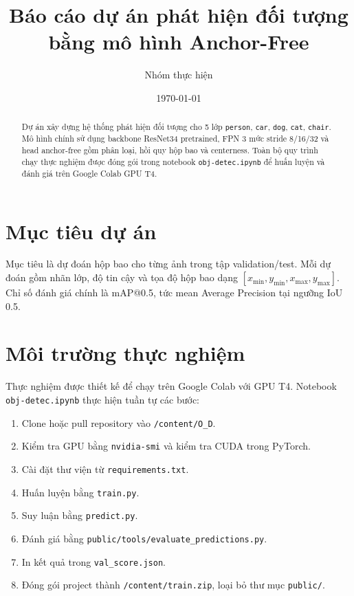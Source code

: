 \documentclass[12pt,a4paper]{article}
\title{\textbf{Báo cáo dự án phát hiện đối tượng bằng mô hình Anchor-Free}}
\author{Nhóm thực hiện}
\date{\today}
\begin{document}
\maketitle

\begin{abstract}
Dự án xây dựng hệ thống phát hiện đối tượng cho 5 lớp \texttt{person}, \texttt{car}, \texttt{dog}, \texttt{cat}, \texttt{chair}. Mô hình chính sử dụng backbone ResNet34 pretrained, FPN 3 mức stride 8/16/32 và head anchor-free gồm phân loại, hồi quy hộp bao và centerness. Toàn bộ quy trình chạy thực nghiệm được đóng gói trong notebook \texttt{obj-detec.ipynb} để huấn luyện và đánh giá trên Google Colab GPU T4.
\end{abstract}

\section{Mục tiêu dự án}

Mục tiêu là dự đoán hộp bao cho từng ảnh trong tập validation/test. Mỗi dự đoán gồm nhãn lớp, độ tin cậy và tọa độ hộp bao dạng \([x_{\min}, y_{\min}, x_{\max}, y_{\max}]\). Chỉ số đánh giá chính là mAP@0.5, tức mean Average Precision tại ngưỡng IoU 0.5.

\section{Môi trường thực nghiệm}

Thực nghiệm được thiết kế để chạy trên Google Colab với GPU T4. Notebook \texttt{obj-detec.ipynb} thực hiện tuần tự các bước:

\begin{enumerate}
  \item Clone hoặc pull repository vào \texttt{/content/O\_D}.
  \item Kiểm tra GPU bằng \texttt{nvidia-smi} và kiểm tra CUDA trong PyTorch.
  \item Cài đặt thư viện từ \texttt{requirements.txt}.
  \item Huấn luyện bằng \texttt{train.py}.
  \item Suy luận bằng \texttt{predict.py}.
  \item Đánh giá bằng \texttt{public/tools/evaluate\_predictions.py}.
  \item In kết quả trong \texttt{val\_score.json}.
  \item Đóng gói project thành \texttt{/content/train.zip}, loại bỏ thư mục \texttt{public/}.
\end{enumerate}
\end{document}
